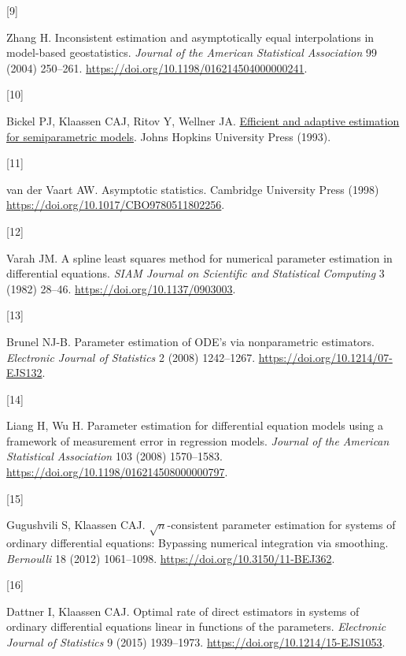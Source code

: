 \documentclass[
  american,
  11pt,
]{article}
\newlength{\cslhangindent}
\newlength{\csllabelwidth}
\newenvironment{CSLReferences}[2] %
 {\begin{list}{}{%
  \setlength{\itemindent}{0pt}
  \setlength{\leftmargin}{0pt}
  \setlength{\parsep}{0pt}
  \ifodd #1
   \setlength{\leftmargin}{\cslhangindent}
   \setlength{\itemindent}{-1\cslhangindent}
  \fi
  \setlength{\itemsep}{#2\baselineskip}}}
 {\end{list}}
\newcommand{\CSLLeftMargin}[1]{\parbox[t]{\csllabelwidth}{\strut#1\strut}}
\newcommand{\CSLRightInline}[1]{\parbox[t]{\linewidth - \csllabelwidth}{\strut#1\strut}}
\begin{document}
\begin{CSLReferences}{0}{0}
\CSLLeftMargin{{[}9{]} }%
\CSLRightInline{Zhang H. Inconsistent estimation and asymptotically
equal interpolations in model-based geostatistics. \emph{Journal of the
American Statistical Association} 99 (2004) 250--261.
\url{https://doi.org/10.1198/016214504000000241}.}

\CSLLeftMargin{{[}10{]} }%
\CSLRightInline{Bickel PJ, Klaassen CAJ, Ritov Y, Wellner JA.
\href{https://faculty.washington.edu/jonw/RESEARCH/BOOKS/book3.html}{Efficient
and adaptive estimation for semiparametric models}. Johns Hopkins
University Press (1993).}

\CSLLeftMargin{{[}11{]} }%
\CSLRightInline{{van der Vaart AW}. Asymptotic statistics. Cambridge
University Press (1998) \url{https://doi.org/10.1017/CBO9780511802256}.}

\CSLLeftMargin{{[}12{]} }%
\CSLRightInline{Varah JM. A spline least squares method for numerical
parameter estimation in differential equations. \emph{SIAM Journal on
Scientific and Statistical Computing} 3 (1982) 28--46.
\url{https://doi.org/10.1137/0903003}.}

\CSLLeftMargin{{[}13{]} }%
\CSLRightInline{Brunel NJ-B. Parameter estimation of {ODE}'s via
nonparametric estimators. \emph{Electronic Journal of Statistics} 2
(2008) 1242--1267. \url{https://doi.org/10.1214/07-EJS132}.}

\CSLLeftMargin{{[}14{]} }%
\CSLRightInline{Liang H, Wu H. Parameter estimation for differential
equation models using a framework of measurement error in regression
models. \emph{Journal of the American Statistical Association} 103
(2008) 1570--1583. \url{https://doi.org/10.1198/016214508000000797}.}

\CSLLeftMargin{{[}15{]} }%
\CSLRightInline{Gugushvili S, Klaassen CAJ. \(\sqrt{n}\)-consistent
parameter estimation for systems of ordinary differential equations:
Bypassing numerical integration via smoothing. \emph{Bernoulli} 18
(2012) 1061--1098. \url{https://doi.org/10.3150/11-BEJ362}.}

\CSLLeftMargin{{[}16{]} }%
\CSLRightInline{Dattner I, Klaassen CAJ. Optimal rate of direct
estimators in systems of ordinary differential equations linear in
functions of the parameters. \emph{Electronic Journal of Statistics} 9
(2015) 1939--1973. \url{https://doi.org/10.1214/15-EJS1053}.}


\end{CSLReferences}
\end{document}
